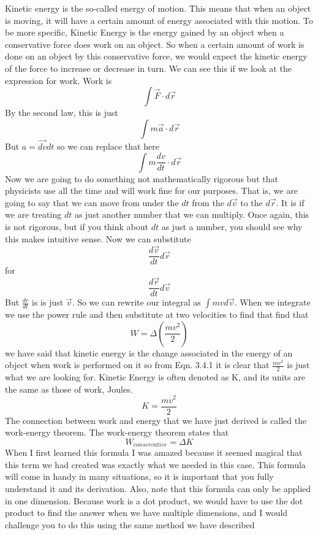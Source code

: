 
Kinetic energy is the so-called energy of motion. This means that when an object is moving, it  will have a certain amount of energy associated with this motion. To be more specific, Kinetic Energy is the energy gained by an object when a conservative force does work on an object. So when a certain amount of work is done on an object by this conservative force, we would expect the kinetic energy of the force to increase or decrease in turn. We can see this if we look at the expression for work. Work is $$\int{\vec{F} \cdot d\vec{r}}$$ By the second law, this is just $$\int{m\vec{a} \cdot d\vec{r}}$$ But $a=\vec{dv}{dt}$ so we can replace that here $$\int{m\frac{dv}{dt} \cdot d\vec{r}}$$ Now we are going to do something not mathematically rigorous but that physicists use all the time and will work fine for our purposes. That is, we are going to say that we can move from under the $dt$ from the $d\vec{v}$ to the $d\vec{r}$. It is if we are treating $dt$ as just another number that we can multiply. Once again, this is not rigorous, but if you think about $dt$ as just a number, you should see why this makes intuitive sense. Now we can substitute $$\frac{d\vec{v}}{dt}d\vec{r}$$ for $$\frac{d\vec{r}}{dt}d\vec{v}$$ But $\frac{dr}{dt}$ is is just $\vec{v}$. So we can rewrite our integral as $\int{mv d\vec{v}}$. When we integrate we use the power rule and then substitute at two velocities to find that find that \begin{equation}W=\Delta\left(\frac{mv^2}{2}\right)\end{equation} we have said that kinetic energy is the change associated in the energy of an object when work is performed on it so from Eqn. 3.4.1 it is clear that $\frac{mv^2}{2}$ is just what we are looking for. Kinetic Energy is often denoted as K, and its units are the same as those of work, Joules. \begin{equation}K=\frac{mv^2}{2}\end{equation} The connection between work and energy that we have just derived is called the work-energy theorem. The work-energy theorem states that \begin{equation}W_{conservative}=\Delta K\end{equation} When I first learned this formula I was amazed because it seemed magical that this term we had created was exactly what we needed in this case. This formula will come in handy in many situations, so it is important that you fully understand it and its derivation. Also, note that this formula can only be applied in one dimension. Because work is a dot product, we would have to use the dot product to find the answer when we have multiple dimensions, and I would challenge you to do this using the same method we have described 